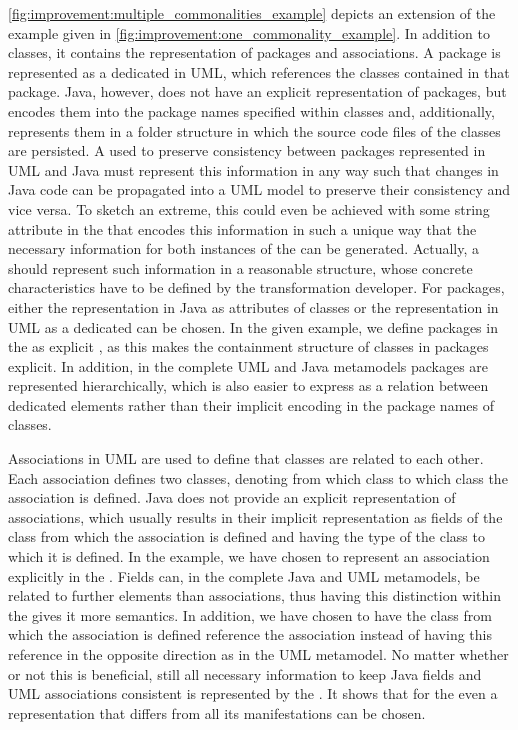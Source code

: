 \autoref{fig:improvement:multiple_commonalities_example} depicts an extension of the example given in \autoref{fig:improvement:one_commonality_example}.
In addition to classes, it contains the representation of packages and associations.
A package is represented as a dedicated \metaclass in \gls{UML}, which references the classes contained in that package.
Java, however, does not have an explicit representation of packages, but encodes them into the package names specified within classes and, additionally, represents them in a folder structure in which the source code files of the classes are persisted.
A \conceptmetamodel used to preserve consistency between packages represented in \gls{UML} and Java must represent this information in any way such that changes in Java code can be propagated into a \gls{UML} model to preserve their consistency and vice versa.
To sketch an extreme, this could even be achieved with some string attribute in the \conceptmetamodel that encodes this information in such a unique way that the necessary information for both instances of the \concretemetamodels can be generated.
Actually, a \conceptmetamodel should represent such information in a reasonable structure, whose concrete characteristics have to be defined by the transformation developer.
For packages, either the representation in Java as attributes of classes or the representation in \gls{UML} as a dedicated \metaclass can be chosen.
In the given example, we define packages in the \conceptmetamodel as explicit \metaclasses, as this makes the containment structure of classes in packages explicit.
In addition, in the complete \gls{UML} and Java metamodels packages are represented hierarchically, which is also easier to express as a relation between dedicated elements rather than their implicit encoding in the package names of classes.

Associations in \gls{UML} are used to define that classes are related to each other.
Each association defines two classes, denoting from which class to which class the association is defined.
Java does not provide an explicit representation of associations, which usually results in their implicit representation as fields of the class from which the association is defined and having the type of the class to which it is defined.
In the example, we have chosen to represent an association explicitly in the \conceptmetamodel.
Fields can, in the complete Java and \gls{UML} metamodels, be related to further elements than associations, thus having this distinction within the \conceptmetamodel gives it more semantics.
In addition, we have chosen to have the class from which the association is defined reference the association instead of having this reference in the opposite direction as in the \gls{UML} metamodel.
No matter whether or not this is beneficial, still all necessary information to keep Java fields and \gls{UML} associations consistent is represented by the \conceptmetamodel.
It shows that for the \conceptmetamodel even a representation that differs from all its manifestations can be chosen.

